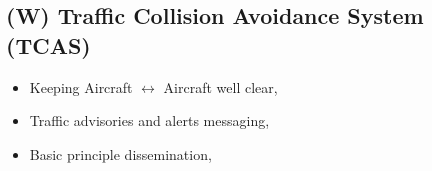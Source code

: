 \subsection{(W) Traffic Collision Avoidance System (TCAS)}\label{sec:TCAS}
\begin{itemize}
    \item Keeping Aircraft $\leftrightarrow$ Aircraft well clear,
    \item Traffic advisories and alerts messaging,
    \item Basic principle dissemination,
\end{itemize}


